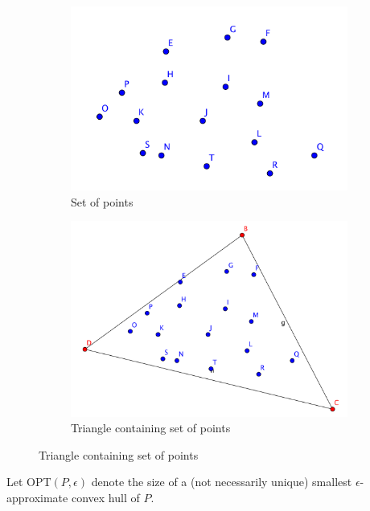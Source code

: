 \begin{figure}[!htb]
\centering
\begin{subfigure}[b]{.4\linewidth}
\includegraphics[width=\linewidth]{set_of_points_for_triangle}
\caption{Set of points}\label{fig:set_of_points_for_triangle}
\end{subfigure}\hspace{20 mm}
\begin{subfigure}[b]{.4\linewidth}
\includegraphics[width=\linewidth]{triangle_containing_set_of_points}
\caption{Triangle containing set of points}\label{fig:triangle_containing_set_of_points}
\end{subfigure}
\label{fig:triangle_containing_points}
\end{figure}

\begin{definition}
Let OPT$(P, \epsilon)$ denote the size of a (not necessarily unique) smallest $\epsilon$-approximate convex hull of $P$.
\end{definition}

